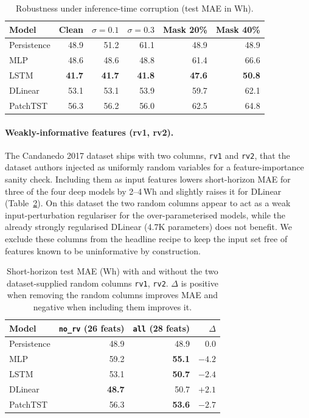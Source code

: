 \documentclass{article}
\begin{document}
\begin{table}[!htbp]
\centering
\small
\caption{Robustness under inference-time corruption (test MAE in Wh).}
\label{tab:corr}
\begin{tabular}{lrrrrr}
\toprule
Model & Clean & $\sigma{=}0.1$ & $\sigma{=}0.3$ & Mask 20\% & Mask 40\% \\
\midrule
Persistence & 48.9          & 51.2          & 61.1          & 48.9          & 48.9          \\
MLP         & 48.6          & 48.6          & 48.8          & 61.4          & 66.6          \\
LSTM        & \textbf{41.7} & \textbf{41.7} & \textbf{41.8} & \textbf{47.6} & \textbf{50.8} \\
DLinear     & 53.1          & 53.1          & 53.9          & 59.7          & 62.1          \\
PatchTST    & 56.3          & 56.2          & 56.0          & 62.5          & 64.8          \\
\bottomrule
\end{tabular}
\end{table}

\paragraph{Weakly-informative features (rv1, rv2).}
The Candanedo 2017 dataset ships with two columns, \texttt{rv1} and
\texttt{rv2}, that the dataset authors injected as uniformly random
variables for a feature-importance sanity check. Including them as
input features lowers short-horizon MAE for three of the four deep
models by 2--4\,Wh and slightly raises it for DLinear
(Table~\ref{tab:rv}). On this dataset the two random columns appear to
act as a weak input-perturbation regulariser for the over-parameterised
models, while the already strongly regularised DLinear (4.7K
parameters) does not benefit. We exclude these columns from the
headline recipe to keep the input set free of features known to be
uninformative by construction.

\begin{table}[!htbp]
\centering
\small
\caption{Short-horizon test MAE (Wh) with and without the two
  dataset-supplied random columns \texttt{rv1}, \texttt{rv2}.
  $\Delta$ is positive when removing the random columns improves MAE
  and negative when including them improves it.}
\label{tab:rv}
\begin{tabular}{lrrr}
\toprule
Model & \texttt{no\_rv} (26 feats) & \texttt{all} (28 feats) & $\Delta$ \\
\midrule
Persistence & 48.9          & 48.9           & 0.0  \\
MLP         & 59.2          & \textbf{55.1}  & $-4.2$ \\
LSTM        & 53.1          & \textbf{50.7}  & $-2.4$ \\
DLinear     & \textbf{48.7} & 50.7           & $+2.1$ \\
PatchTST    & 56.3          & \textbf{53.6}  & $-2.7$ \\
\bottomrule
\end{tabular}
\end{table}
\end{document}
